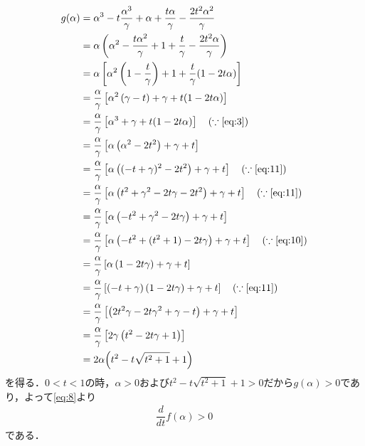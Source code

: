 \documentclass[../../main.tex]{subfiles}
\begin{document}
\begin{align}
  g(\alpha)
  & = \alpha^3 - t\dfrac{\alpha^3}{\gamma} + \alpha + \dfrac{t\alpha}{\gamma} - \dfrac{2t^2 \alpha^2}{\gamma} \\
  & = \alpha\left(\alpha^2 - \dfrac{t\alpha^2}{\gamma} + 1 + \dfrac{t}{\gamma} - \dfrac{2t^2\alpha}{\gamma} \right) \\
  & = \alpha \left[\alpha^2\left(1-\dfrac{t}{\gamma}\right)+1+\dfrac{t}{\gamma}(1-2t\alpha)\right] \\
  & = \dfrac{\alpha}{\gamma} \left[\alpha^2\left(\gamma-t\right)+\gamma+t(1-2t\alpha)\right] \\
  & = \dfrac{\alpha}{\gamma} \left[\alpha^3+\gamma+t(1-2t\alpha)\right] \quad (\because \text{\cref{eq:3}})\\
  & = \dfrac{\alpha}{\gamma} \left[\alpha\left(\alpha^2-2t^2\right)+\gamma+t\right] \\
  & = \dfrac{\alpha}{\gamma} \left[\alpha\left((-t + \gamma)^2-2t^2\right)+\gamma+t\right] \quad (\because\text{\cref{eq:11}})\\
  & = \dfrac{\alpha}{\gamma} \left[\alpha\left(t^2+\gamma^2-2t\gamma-2t^2\right)+\gamma+t\right] \quad (\because\text{\cref{eq:11}})\\
  & = \dfrac{\alpha}{\gamma} \left[\alpha\left(-t^2+\gamma^2-2t\gamma\right)+\gamma+t\right]  \\
  & = \dfrac{\alpha}{\gamma} \left[\alpha\left(-t^2+(t^2+1)-2t\gamma\right)+\gamma+t\right] \quad (\because\text{\cref{eq:10}})\\
  & = \dfrac{\alpha}{\gamma} \left[\alpha\left(1-2t\gamma\right)+\gamma+t\right] \\
  & = \dfrac{\alpha}{\gamma} \left[\left(-t+\gamma\right)\left(1-2t\gamma\right)+\gamma+t\right] \quad (\because\text{\cref{eq:11}}) \\
  & = \dfrac{\alpha}{\gamma} \left[\left(2t^2\gamma-2t\gamma^2+\gamma-t\right)+\gamma+t\right] \\
  & = \dfrac{\alpha}{\gamma} \left[2\gamma\left(t^2-2t\gamma+1\right)\right] \\
  & = 2\alpha \Bigl( t^2 - t\sqrt{t^2+1} + 1 \Bigr)
\end{align}
を得る．$0<t<1$の時，$\alpha>0$および$t^2 - t\sqrt{t^2+1} + 1>0$だから$g(\alpha)>0$であり，よって\cref{eq:8}より
\begin{align}
  \dfrac{d}{dt} f(\alpha) > 0
\end{align}
である．
\end{document}
